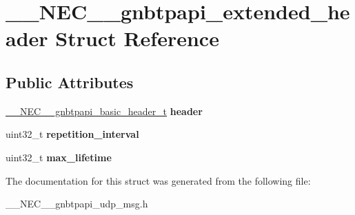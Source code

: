 \hypertarget{struct____NEC____gnbtpapi__extended__header}{\section{\-\_\-\-\_\-\-N\-E\-C\-\_\-\-\_\-gnbtpapi\-\_\-extended\-\_\-header \-Struct \-Reference}
\label{struct____NEC____gnbtpapi__extended__header}
}
\subsection*{\-Public \-Attributes}
\begin{DoxyCompactItemize}
\item 
\hypertarget{struct____NEC____gnbtpapi__extended__header_a1c4c32e3d48fdee896bf78506b3cb223}{\hyperlink{struct____NEC____gnbtpapi__basic__header}{\-\_\-\-\_\-\-N\-E\-C\-\_\-\-\_\-gnbtpapi\-\_\-basic\-\_\-header\-\_\-t} {\bfseries header}}\label{struct____NEC____gnbtpapi__extended__header_a1c4c32e3d48fdee896bf78506b3cb223}

\item 
\hypertarget{struct____NEC____gnbtpapi__extended__header_af9464f552a1bfb67a6624da87f85ec13}{uint32\-\_\-t {\bfseries repetition\-\_\-interval}}\label{struct____NEC____gnbtpapi__extended__header_af9464f552a1bfb67a6624da87f85ec13}

\item 
\hypertarget{struct____NEC____gnbtpapi__extended__header_ae314f7e4a01fd829c1a3abdffd4d894b}{uint32\-\_\-t {\bfseries max\-\_\-lifetime}}\label{struct____NEC____gnbtpapi__extended__header_ae314f7e4a01fd829c1a3abdffd4d894b}

\end{DoxyCompactItemize}


\-The documentation for this struct was generated from the following file\-:\begin{DoxyCompactItemize}
\item 
\-\_\-\-\_\-\-N\-E\-C\-\_\-\-\_\-gnbtpapi\-\_\-udp\-\_\-msg.\-h\end{DoxyCompactItemize}
